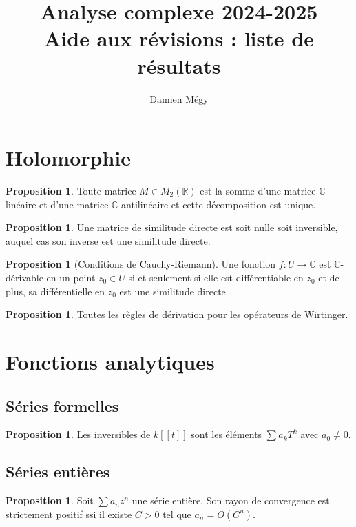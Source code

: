 \documentclass[11pt,a4paper]{article}
\title{Analyse complexe 2024-2025\\ Aide aux révisions : liste de résultats}
\author{Damien Mégy}
\newcommand{\R}{\mathbb{R}}
\newcommand{\C}{\mathbb{C}}
\theoremstyle{definition}
\newtheorem{prop}[theoreme]{Proposition}
\theoremstyle{plain}
\begin{document}
\maketitle
\tableofcontents

\section{Holomorphie}

\begin{prop}
Toute matrice $M\in M_2(\R)$ est la somme d'une matrice $\C$-linéaire et d'une matrice $\C$-antilinéaire et cette décomposition est unique.
\end{prop}

\begin{prop}
Une matrice de similitude directe est soit nulle soit inversible, auquel cas son inverse est une similitude directe.
\end{prop}

\begin{prop}[Conditions de Cauchy-Riemann]
Une fonction $f:U\to \C$ est $\C$-dérivable en un point $z_0 \in U$ si et seulement si elle est différentiable en $z_0$ et de plus, sa différentielle en $z_0$ est une similitude directe.
\end{prop}

\begin{prop}
Toutes les règles de dérivation pour les opérateurs de Wirtinger.
\end{prop}
\section{Fonctions analytiques}

\subsection{Séries formelles}

\begin{prop}
Les inversibles de $k[[t]]$ sont les éléments $\sum a_kT^k$ avec $a_0\neq 0$.
\end{prop}

\subsection{Séries entières}


\begin{prop}
Soit $\sum a_nz^n$ une série entière.
Son rayon de convergence est strictement positif  ssi il existe $C>0$ tel que $a_n = O\left(C^n\right)$.
\end{prop}
\end{document}
